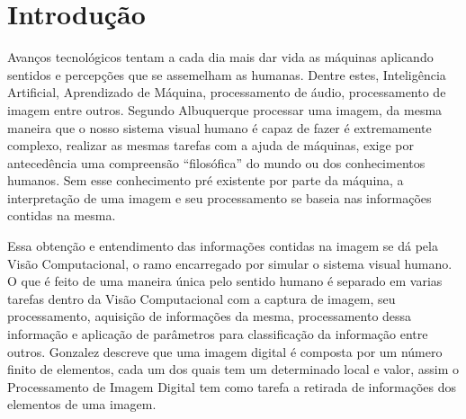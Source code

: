 \chapter{Introdução} \label{Cap:Introducao}
Avanços tecnológicos tentam a cada dia mais dar vida as máquinas aplicando sentidos e percepções que se assemelham as humanas. Dentre estes, Inteligência Artificial, Aprendizado de Máquina, processamento de áudio, processamento de imagem entre outros. Segundo Albuquerque\cite{Albuquerque:2001} processar uma imagem, da mesma maneira que o nosso sistema visual humano é capaz de fazer é extremamente complexo, realizar as mesmas tarefas com a ajuda de máquinas, exige por antecedência uma compreensão “filosófica” do mundo ou dos conhecimentos humanos. Sem esse conhecimento pré existente por parte da máquina, a interpretação de uma imagem e seu processamento se baseia nas informações contidas na mesma.
	
	 Essa obtenção e entendimento das informações contidas na imagem se dá pela Visão Computacional, o ramo encarregado por simular o sistema visual humano. O que é feito de uma maneira única pelo sentido humano é separado em varias tarefas dentro da Visão Computacional com a captura de imagem, seu processamento, aquisição de informações da mesma, processamento dessa informação e aplicação de parâmetros para classificação da informação entre outros. Gonzalez\cite{Gonzalez:2008} descreve que uma imagem digital é composta por um número finito de elementos, cada um dos quais tem um determinado local e valor, assim o Processamento de Imagem Digital tem como tarefa a retirada de informações dos elementos de uma imagem.
	
